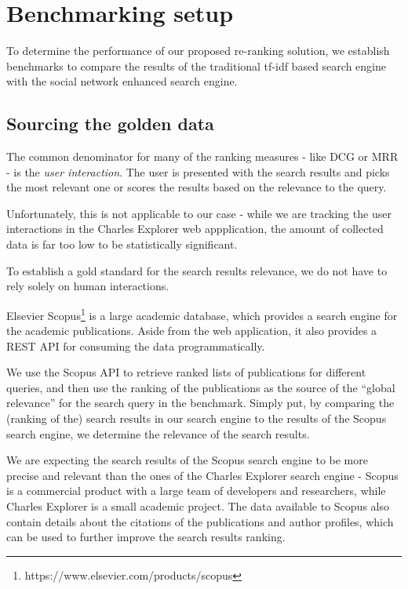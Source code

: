 \section{Benchmarking setup}

To determine the performance of our proposed re-ranking solution, we establish benchmarks to compare the results of the traditional tf-idf based search engine with the social network enhanced search engine.

\subsection{Sourcing the golden data}

The common denominator for many of the ranking measures - like \ac{DCG} or \ac{MRR} - is the \textit{user interaction}.
The user is presented with the search results and picks the most relevant one or scores the results based on the relevance to the query.

Unfortunately, this is not applicable to our case - while we are tracking the user interactions in the Charles Explorer web appplication, the amount of collected data is far too low to be statistically significant.

To establish a gold standard for the search results relevance, we do not have to rely solely on human interactions.

Elsevier Scopus\footnote{https://www.elsevier.com/products/scopus} is a large academic database, which provides a search engine for the academic publications.
Aside from the web application, it also provides a REST API for consuming the data programmatically.

We use the Scopus API to retrieve ranked lists of publications for different queries, and then use the ranking of the publications as the source of the ``global relevance'' for the search query in the benchmark.
Simply put, by comparing the (ranking of the) search results in our search engine to the results of the Scopus search engine, we determine the relevance of the search results.

We are expecting the search results of the Scopus search engine to be more precise and relevant than the ones of the Charles Explorer search engine -
Scopus is a commercial product with a large team of developers and researchers, while Charles Explorer is a small academic project.
The data available to Scopus also contain details about the citations of the publications and author profiles, which can be used to further improve the search results ranking.

